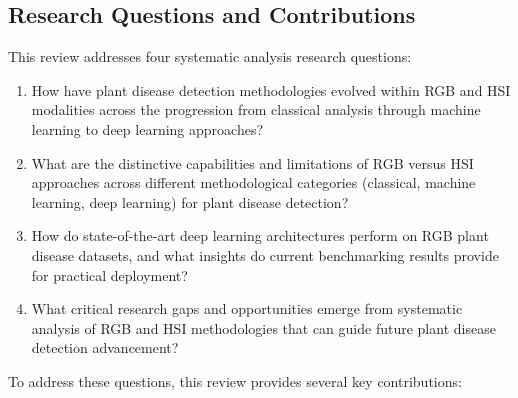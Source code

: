 \documentclass[sn-mathphys]{sn-jnl}
\theoremstyle{thmstyleone}%
\theoremstyle{thmstyletwo}%
\theoremstyle{thmstylethree}%
\begin{document}
\subsection{Research Questions and Contributions}

This review addresses four systematic analysis research questions:

\begin{enumerate}
    \item How have plant disease detection methodologies evolved within RGB and HSI modalities across the progression from classical analysis through machine learning to deep learning approaches?
    
    \item What are the distinctive capabilities and limitations of RGB versus HSI approaches across different methodological categories (classical, machine learning, deep learning) for plant disease detection?
    
    \item How do state-of-the-art deep learning architectures perform on RGB plant disease datasets, and what insights do current benchmarking results provide for practical deployment?
    
    \item What critical research gaps and opportunities emerge from systematic analysis of RGB and HSI methodologies that can guide future plant disease detection advancement?
\end{enumerate}

To address these questions, this review provides several key contributions:
\end{document}
